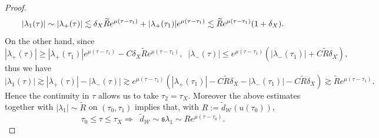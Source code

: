 \documentclass[reqno, 11pt]{amsart}
\numberwithin{equation}{section}
\theoremstyle{plain}
\theoremstyle{definition}
\numberwithin{equation}{section}
\numberwithin{theorem}{section}
\numberwithin{equation}{section}
\numberwithin{equation}{section}
\numberwithin{theorem}{section}
\begin{document}
\begin{proof}
\begin{equation*}
		|\lambda_{1}(\tau)|\sim|\lambda_{+}(\tau)|\lesssim \delta_{X}\widetilde{R}e^{\mu(\tau-\tau_{1})}+|\lambda_{+}(\tau_1)|e^{\mu(\tau-\tau_{1})}\\\lesssim\widetilde{R}e^{\mu(\tau-\tau_{1})}(1+\delta_{X}).
		\end{equation*}
		On the other hand, since
		\begin{equation*}
		|\lambda_{+}(\tau)|\geq|\lambda_{+}(\tau_1)|e^{\mu(\tau-\tau_{1})}-C\delta_{X}\widetilde{R}e^{\mu(\tau-\tau_{1})},\;\;|\lambda_{-}(\tau)|\leq e^{\mu(\tau-\tau_{1})}\left(|\lambda_{-}(\tau_1)|+C\widetilde{R}\delta_{X}\right),
		\end{equation*}
		thus we have 
		\begin{equation*}
		|\lambda_{1}(\tau)|\gtrsim|\lambda_{+}(\tau)|-|\lambda_{-}(\tau)|\gtrsim e^{\mu(\tau-\tau_{1})}\left(|\lambda_{+}(\tau_{1})|-C\widetilde{R}\delta_{X}-|\lambda_{-}(\tau_{1})|-C\widetilde{R}\delta_{X}\right)\gtrsim \widetilde{R}e^{\mu(\tau-\tau_{1})}.
		\end{equation*}
		Hence the continuity in $\tau$ allows us to take $\tau_{2}=\tau_{X}$. Moreover the above estimates together with $|\lambda_{1}|\sim \widetilde{R}$ on $(\tau_{0},\tau_{1})$ implies that, with $R:=\widetilde{d}_{\mathcal{W}}(u(\tau_{0}))$,
		\begin{equation*}
		\tau_{0} \leq \tau \leq \tau_{X} \Longrightarrow\;\;\widetilde{d}_{\mathcal{W}} \sim \mathfrak{s}\lambda_{1}\sim Re^{\mu(\tau-\tau_{0})}.
		\end{equation*}
		

\end{proof}
\end{document}
